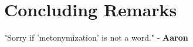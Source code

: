 
\setcounter{chapter}{10}
\chapter{Concluding Remarks}
\large
"Sorry if 'metonymization' is not a word." - \textbf{Aaron}